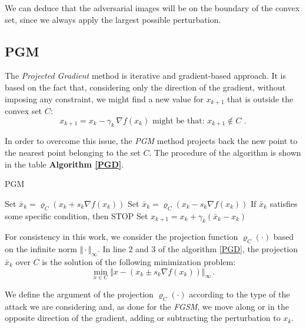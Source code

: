 \documentclass[10pt,twocolumn,letterpaper, english]{article}
\theoremstyle{definition}
\theoremstyle{plain}
\theoremstyle{plain}
\theoremstyle{plain}
\theoremstyle{plain}
\theoremstyle{remark}
\theoremstyle{remark}
\theoremstyle{definition}
\theoremstyle{definition}
\theoremstyle{definition}
\theoremstyle{definition}
\renewcommand{\rho}{\varrho}
\begin{document}
We can deduce that the adversarial images will be on the boundary of the convex set, since we always apply the largest possible perturbation. 

\subsection{PGM}

The \textit{Projected Gradient} method is iterative and gradient-based approach. 
It is based on the fact that, considering only the direction of the gradient, without imposing any constraint, we might find a new value for $x_{k+1}$ that is outside the convex set $C$: 
\begin{equation*}
    x_{k+1} = x_k - \gamma_k \, \nabla f(x_k) \text{   might be that: } x_{k+1} \notin C \,\,.
\end{equation*}

In order to overcome this issue, the \textit{PGM} method projects back the new point to the nearest point belonging to the set $C$. 
The procedure of the algorithm is shown in the table \textbf{Algorithm \ref{PGD}}. 

\begin{algorithm}
\caption{PGM}\label{PGD}
\begin{algorithmic}[1]
  \State Set $ \bar{x}_k = \rho_C(x_k + s_k \nabla f(x_k))$ 
  \State Set $ \bar{x}_k = \rho_C(x_k - s_k \nabla f(x_k))$ 
  \State If $\bar{x}_k$ satisfies some specific condition, then STOP
  \State Set $x_{k+1} = x_k + \gamma_k (\bar{x}_k - x_k)$ \Comment{with $\gamma_k \in (0, 1]$}
    
\EndFor
\end{algorithmic}
\end{algorithm}

For consistency in this work, we consider the projection function $\rho_C(\cdot)$ based on the infinite norm $\Vert \cdot \Vert_\infty$. 
In line 2 and 3 of the algorithm \ref{PGD}, the projection $\bar{x}_k$ over $C$ is the solution of the following minimization problem: 
\begin{equation*}
    \min_{x \in C} \Vert x - (x_k \pm s_k \nabla f(x_k)) \Vert_\infty \,. 
\end{equation*}

We define the argument of the projection $\rho_C(\cdot)$ according to the type of the attack we are considering and, as done for the \textit{FGSM}, we move along or in the opposite direction of the gradient, adding or subtracting the perturbation to $x_k$. \\
\end{document}
